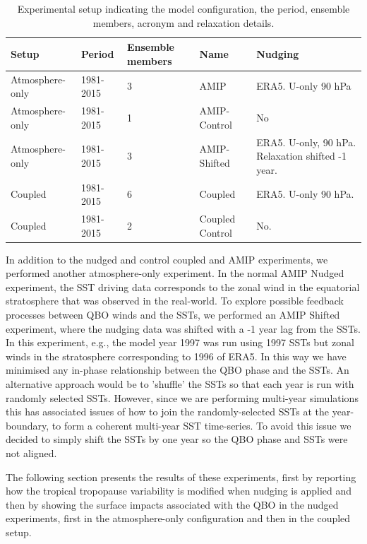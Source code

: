\begin{table}[t!]
\caption{Experimental setup indicating the model configuration, the period, ensemble members, acronym and relaxation details.}
\begin{tabular}{p{2.3cm}|p{2.3cm}|p{1.73cm}|p{3cm}|p{5cm}}
Setup           & Period    & Ensemble members & Name            & Nudging                                          \\ \hline \hline
Atmosphere-only & 1981-2015 & 3                & AMIP            & ERA5. U-only 90 hPa                              \\
Atmosphere-only & 1981-2015 & 1                & AMIP-Control    & No                                               \\
Atmosphere-only & 1981-2015 & 3                & AMIP-Shifted    & ERA5. U-only, 90 hPa. Relaxation shifted -1 year. \\
Coupled         & 1981-2015 & 6                & Coupled         & ERA5. U-only 90 hPa.                             \\
Coupled         & 1981-2015 & 2                & Coupled Control & No.                                             
\end{tabular}
\end{table}

In addition to the nudged and control coupled and AMIP experiments, we performed another atmosphere-only experiment. In the normal AMIP Nudged experiment, the SST driving data corresponds to the zonal wind in the equatorial stratosphere that was observed in the real-world. To explore possible feedback processes between QBO winds and the SSTs, we performed an AMIP Shifted experiment, where the nudging data was shifted with a -1 year lag from the SSTs. In this experiment, e.g., the model year 1997 was run using 1997 SSTs but zonal winds in the stratosphere corresponding to 1996 of ERA5. In this way we have minimised any in-phase relationship between the QBO phase and the SSTs. An alternative approach would be to 'shuffle' the SSTs so that each year is run with randomly selected SSTs. However, since we are performing multi-year simulations this has associated issues of how to join the randomly-selected SSTs at the year-boundary, to form a coherent multi-year SST time-series. To avoid this issue we decided to simply shift the SSTs by one year so the QBO phase and SSTs were not aligned.  

The following section presents the results of these experiments, first by reporting how the tropical tropopause variability is modified when nudging is applied and then by showing the surface impacts associated with the QBO in the nudged experiments, first in the atmosphere-only configuration and then in the coupled setup.

